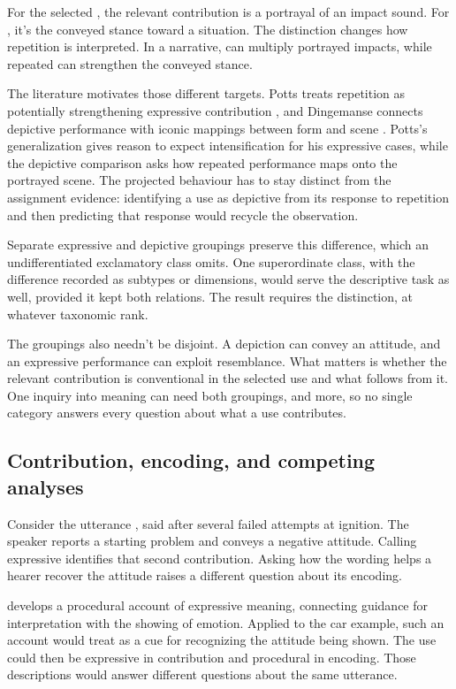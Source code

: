 \documentclass[12pt]{article}
\begin{document}
For the selected , the relevant contribution is a portrayal
of an impact sound. For , it's the conveyed stance toward
a situation. The distinction changes how repetition is interpreted. In a
narrative,  can multiply portrayed impacts, while
repeated  can strengthen the conveyed stance.

The literature motivates those different targets. Potts treats repetition
as potentially strengthening expressive contribution \citep[167, 182]{potts2007},
and Dingemanse connects depictive performance with iconic mappings between
form and scene \citep[10--11]{dingemanse2018}. Potts's generalization
gives reason to expect intensification for his expressive cases, while the
depictive comparison asks how repeated performance maps onto the portrayed
scene. The projected behaviour has to stay distinct from the assignment
evidence: identifying a use as depictive from its response to repetition
and then predicting that response would recycle the observation.

Separate expressive and depictive groupings preserve this difference, which
an undifferentiated exclamatory class omits. One superordinate class, with
the difference recorded as subtypes or dimensions, would serve the
descriptive task as well, provided it kept both relations. The result
requires the distinction, at whatever taxonomic rank.

The groupings also needn't be disjoint. A depiction can convey an attitude,
and an expressive performance can exploit resemblance. What matters is
whether the relevant contribution is conventional in the selected use and
what follows from it. One inquiry into meaning can need both groupings,
and more, so no single category answers every question about what a use
contributes.

\subsection{Contribution, encoding, and competing analyses}\label{sec:encoding}

Consider the utterance ,
said after several failed attempts at ignition. The speaker reports a
starting problem and conveys a negative attitude. Calling 
expressive identifies that second contribution. Asking how the wording
helps a hearer recover the attitude raises a different question about
its encoding.

\textcite{wharton2016expressives} develops a procedural account of expressive
meaning, connecting guidance for interpretation with the showing of emotion.
Applied to the car example, such an account would treat 
as a cue for recognizing the attitude being shown. The use could then
be expressive in contribution and procedural in encoding. Those descriptions
would answer different questions about the same utterance.
\end{document}
